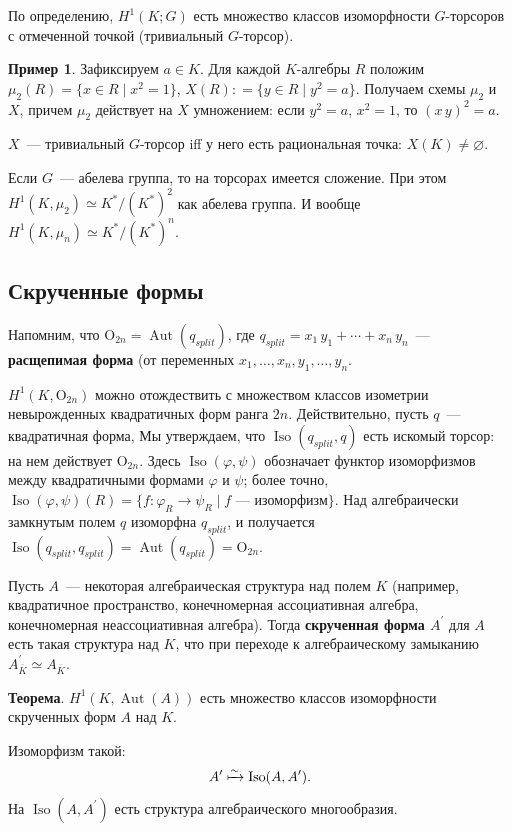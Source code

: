 \documentclass[a4paper]{article}
\DeclareMathOperator{\Aut}{Aut}
\DeclareMathOperator{\Iso}{Iso}
\renewcommand{\O}{\mathrm{O}}
\newcommand{\ph}{\varphi}
\renewcommand{\emptyset}{\varnothing}
\newcommand{\term}{\textbf}
\newcommand{\dfn}{\mathrel{\mathop:}=}
\newcommand{\isom}{\simeq}
\theoremstyle{definition}
\newtheorem{example}[theorem]{Пример}
\begin{document}
По определению, $H^1 (K;G)$ есть множество классов изоморфности
$G$-торсоров с отмеченной точкой (тривиальный $G$-торсор).

\begin{example}
Зафиксируем $a\in K$.
Для каждой $K$-алгебры $R$ положим
$\mu_2(R) = \{ x\in R\mid x^2 = 1 \}$, $X(R) \dfn \{ y\in R\mid y^2 = a\}$.
Получаем схемы $\mu_2$ и $X$, причем
$\mu_2$ действует на $X$ умножением:
если $y^2 = a$, $x^2 = 1$, то $(x\,y)^2 = a$.
\end{example}

$X$~--- тривиальный $G$-торсор iff у него есть рациональная точка: $X
(K) \ne \emptyset$.

Если $G$~--- абелева группа, то на торсорах имеется сложение. При этом
$H^1 (K,\mu_2) \isom K^* / (K^*)^2$ как абелева группа. И вообще $H^1
(K,\mu_n) \isom K^* / (K^*)^n$.

\subsection{Скрученные формы}

Напомним, что $\O_{2n} = \Aut (q_{split})$, где $q_{split} = x_1\,y_1 + \cdots +
x_n\,y_n$~--- \term{расщепимая форма} (от переменных $x_1,\dots,x_n,y_1,\dots,y_n$.

$H^1 (K, \O_{2n})$ можно отождествить с множеством классов изометрии
невырожденных квадратичных форм ранга $2n$. 
Действительно, пусть $q$~--- квадратичная форма,
Мы утверждаем, что $\Iso (q_{split},
q)$ есть искомый торсор: на нем действует $\O_{2n}$.
Здесь $\Iso(\ph,\psi)$ обозначает функтор изоморфизмов между квадратичными
формами $\ph$ и $\psi$; более точно,
$\Iso(\ph,\psi)(R) = \{f\colon\ph_R\to\psi_R\mid\mbox{$f$~--- изоморфизм}\}$.
Над алгебраически
замкнутым полем $q$ изоморфна $q_{split}$, и получается $\Iso
(q_{split},q_{split})=\Aut (q_{split})=\O_{2n}$.

Пусть $A$~--- некоторая алгебраическая структура над полем $K$
(например, квадратичное пространство, конечномерная ассоциативная
алгебра, конечномерная неассоциативная алгебра). Тогда
\term{скрученная форма $A^\prime$} для $A$ есть такая структура над
$K$, что при переходе к алгебраическому замыканию
$A^\prime_{\overline{K}} \isom A_{\overline{K}}$.

\noindent\textbf{Теорема}. $H^1 (K, \Aut(A))$ есть множество классов
изоморфности скрученных форм $A$ над $K$.

Изоморфизм такой:
\[ A' \xmapsto{\sim} \Iso (A,A^\prime). \]
На $\Iso (A,A^\prime)$ есть структура алгебраического многообразия.
\end{document}
